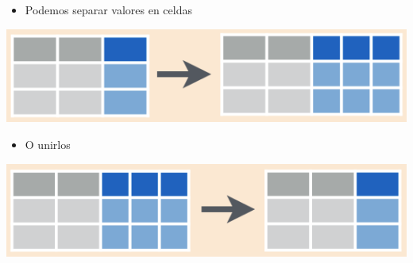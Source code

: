 \documentclass[ignorenonframetext,]{beamer}
\providecommand{\tightlist}{%
  \setlength{\itemsep}{0pt}\setlength{\parskip}{0pt}}
\begin{document}
\begin{frame}{}
\protect\hypertarget{section-7}{}


\begin{itemize}
\tightlist
\item
  Podemos separar valores en celdas
\end{itemize}

\begin{center}\includegraphics[width=0.6\linewidth]{tidyr_separate} \end{center}

\begin{itemize}
\tightlist
\item
  O unirlos
\end{itemize}

\begin{center}\includegraphics[width=0.6\linewidth]{tidyr_unite} \end{center}

\end{frame}
\end{document}
